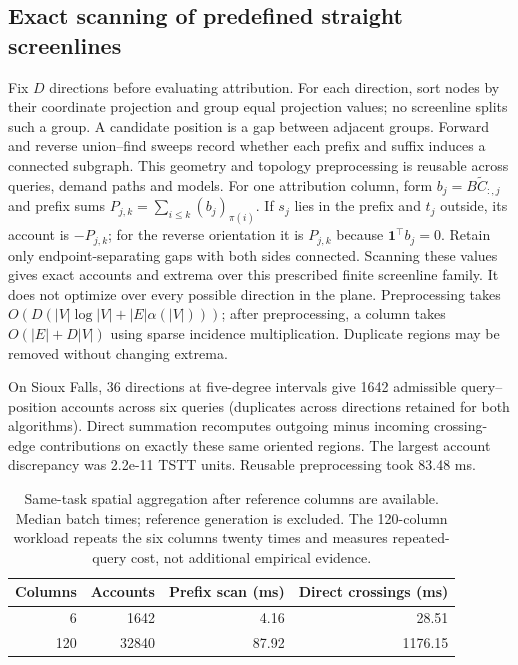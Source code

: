 \subsection{Exact scanning of predefined straight screenlines}\label{sec:scan}
Fix $D$ directions before evaluating attribution. For each direction, sort nodes by their coordinate projection and group equal projection values; no screenline splits such a group. A candidate position is a gap between adjacent groups. Forward and reverse union--find sweeps record whether each prefix and suffix induces a connected subgraph. This geometry and topology preprocessing is reusable across queries, demand paths and models.
For one attribution column, form $b_j=B\widetilde C_{:,j}$ and prefix sums $P_{j,k}=\sum_{i\leq k}(b_j)_{\pi(i)}$. If $s_j$ lies in the prefix and $t_j$ outside, its account is $-P_{j,k}$; for the reverse orientation it is $P_{j,k}$ because $\mathbf1^\top b_j=0$. Retain only endpoint-separating gaps with both sides connected. Scanning these values gives exact accounts and extrema over this prescribed finite screenline family. It does not optimize over every possible direction in the plane. Preprocessing takes $O(D(|V|\log|V|+|E|\alpha(|V|)))$; after preprocessing, a column takes $O(|E|+D|V|)$ using sparse incidence multiplication. Duplicate regions may be removed without changing extrema.

On Sioux Falls, 36 directions at five-degree intervals give 1642 admissible query--position accounts across six queries (duplicates across directions retained for both algorithms). Direct summation recomputes outgoing minus incoming crossing-edge contributions on exactly these same oriented regions. The largest account discrepancy was 2.2e-11 TSTT units. Reusable preprocessing took 83.48 ms. \begin{table}[t]\centering\small\caption{Same-task spatial aggregation after reference columns are available. Median batch times; reference generation is excluded. The 120-column workload repeats the six columns twenty times and measures repeated-query cost, not additional empirical evidence.}\label{tab:scan}\begin{tabular}{rrrr}\toprule Columns & Accounts & Prefix scan (ms) & Direct crossings (ms)\\\midrule
6 & 1642 & 4.16 & 28.51\\
120 & 32840 & 87.92 & 1176.15\\
\bottomrule\end{tabular}\end{table}
